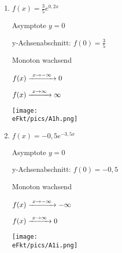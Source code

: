 \begin{Answer}[ref=eFktA1]
\begin{minipage}{\textwidth}
{\begin{minipage}{0.5\textwidth}
\begin{enumerate}[label=\alph*)]
				\(f(x)\xrightarrow{\hphantom{\ }x\to\infty\hphantom{\ }}0\)

				\texttt{[image: \\eFkt/pics/A1g.png]}
				\item \(f(x)=\frac{3}{5}e^{0,2x}\)

				Asymptote \(y=0\)

				y-Achsenabschnitt: \(f(0)=\frac{3}{5}\)

				Monoton wachsend

				\(f(x)\xrightarrow{\hphantom{\ }x\to-\infty\hphantom{\ }}0\)

				\(f(x)\xrightarrow{\hphantom{\ }x\to\infty\hphantom{\ }}\infty\)

				\texttt{[image: \\eFkt/pics/A1h.png]}
				\item \(f(x)=-0,5e^{-3,5x}\)

				Asymptote \(y=0\)

				y-Achsenabschnitt: \(f(0)=-0,5\)

				Monoton wachsend

				\(f(x)\xrightarrow{\hphantom{\ }x\to-\infty\hphantom{\ }}-\infty\)

				\(f(x)\xrightarrow{\hphantom{\ }x\to\infty\hphantom{\ }}0\)

				\texttt{[image: \\eFkt/pics/A1i.png]}
			\end{enumerate}
		\end{minipage}}%
\end{minipage}
\end{Answer}
